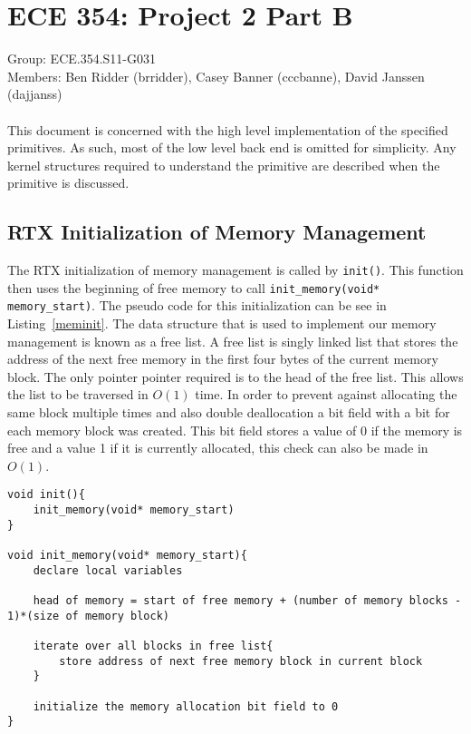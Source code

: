 \documentclass[oneside]{article}
\begin{document}
\lstset{language=C, frame=single, breaklines=true}
\section*{ECE 354: Project 2 Part B}
Group: ECE.354.S11-G031 \\
Members: Ben Ridder (brridder), Casey Banner (cccbanne), 
David Janssen (dajjanss) \\ \\
This document is concerned with the high level implementation of the 
specified primitives. As such, most of the low level back end is omitted for
simplicity. Any kernel structures required to understand the primitive are
described when the primitive is discussed.

\subsection*{RTX Initialization of Memory Management} 
The RTX initialization of memory management is called by \texttt{init()}.
This function then uses the beginning of free memory to call \texttt{init\_memory(void* memory\_start)}.
The pseudo code for this initialization can be see in Listing~\ref{meminit}. 
The data structure that is used to implement our memory management is known as a 
free list. A free list is singly linked list that stores the address of the next 
free memory in the first four bytes of the current memory block. The only pointer 
pointer required is to the head of the free list. This allows the list to be 
traversed in $O(1)$ time. In order to prevent against allocating the same block 
multiple times and also double deallocation a bit field with a bit for each memory 
block was created. This bit field stores a value of 0 if the memory is free and a 
value 1 if it is currently allocated, this check can also be made in $O(1)$. 

\begin{lstlisting}
void init(){
    init_memory(void* memory_start)
}

void init_memory(void* memory_start){
    declare local variables
    
    head of memory = start of free memory + (number of memory blocks - 1)*(size of memory block)

    iterate over all blocks in free list{
        store address of next free memory block in current block
    }

    initialize the memory allocation bit field to 0
}
\end{lstlisting}
\end{document}
